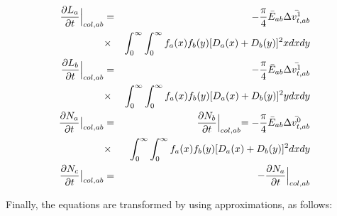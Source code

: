 \begin{eqnarray}
\frac{\partial L_{a}}{\partial t}\Bigr|_{col,ab}&=&-\frac{\pi}{4}\bar{E}_{ab}\bar{\Delta v_{t,ab}^{1}}\nonumber\\
&\times& \int_{0}^{\infty}\int_{0}^{\infty}f_{a}(x)f_{b}(y)[D_{a}(x)+D_{b}(y)]^{2}xdxdy\label{sn191}\\
\frac{\partial L_{b}}{\partial t}\Bigr|_{col,ab}&=&-\frac{\pi}{4}\bar{E}_{ab}\bar{\Delta v_{t,ab}^{1}}\nonumber\\
&\times&\int_{0}^{\infty}\int_{0}^{\infty}f_{a}(x)f_{b}(y)[D_{a}(x)+D_{b}(y)]^{2}ydxdy\label{sn192}\\
\frac{\partial N_{a}}{\partial t}\bigr|_{col,ab}&=&\frac{\partial N_{b}}{\partial t}\Bigl|_{col,ab}=-\frac{\pi}{4}\bar{E}_{ab}\bar{\Delta v_{t,ab}^{0}}\nonumber\\
&\times&\int_{0}^{\infty}\int_{0}^{\infty}f_{a}(x)f_{b}(y)[D_{a}(x)+D_{b}(y)]^{2}dxdy\label{sn193}\\
\frac{\partial N_{c}}{\partial t}\bigr|_{col,ab}&=&-\frac{\partial N_{a}}{\partial t}\Bigl|_{col,ab}\label{sn194}
\end{eqnarray}

Finally, the equations are transformed by using approximations, as follows:


